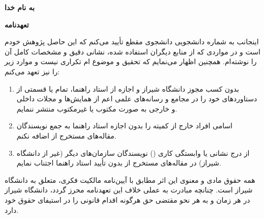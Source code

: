 \centerline{\textbf{به نام خدا}}

\vspace{\baselineskip}
\centerline{\textbf{تعهدنامه}}

\vspace{\baselineskip}

اینجانب {\persianname} به شماره دانشجویی {\persianstudentnumber} دانشجوی مقطع {\persiandegree} تأیید می‌کنم که این {\persiantype} حاصل پژوهش خودم است و در مواردی که از منابع دیگران استفاده شده، نشانی دقیق و مشخصات کامل آن را نوشته‌ام. همچنین اظهار می‌نمایم که تحقیق و موضوع {\persiantype}‌ام تکراری نیست و موارد زیر را نیز تعهد می‌کنم:

\begin{enumerate}[label=\arabic*-]
    \item بدون کسب مجوز دانشگاه شیراز و اجازه از استاد راهنما، تمام یا قسمتی از دستاوردهای {\persiantype} خود را در مجامع و رسانه‌های علمی اعم از همایش‌ها و مجلات داخلی و خارجی به صورت مکتوب یا غیرمکتوب منتشر ننمایم.
    \item اسامی افراد خارج از کمیته {\persiantype} را بدون اجازه استاد راهنما به جمع نویسندگان مقاله‌های مستخرج از {\persiantype} اضافه نکنم.
    \item از درج نشانی یا وابستگی کاری () نویسندگان سازمان‌های دیگر (غیر از دانشگاه شیراز) در مقاله‌های مستخرج از {\persiantype} بدون تأیید استاد راهنما اجتناب نمایم.
\end{enumerate}

همه حقوق مادی و معنوی این اثر مطابق با آیین‌نامه مالکیت فکری، متعلق به دانشگاه شیراز است. چنانچه مبادرت به عملی خلاف این تعهدنامه محرز گردد، دانشگاه شیراز در هر زمان و به هر نحو مقتضی حق هرگونه اقدام قانونی را در استیفای حقوق خود دارد.

\vspace{2\baselineskip}
\centerline{{\persianname}}
\centerline{{\persiandefensedate}}
